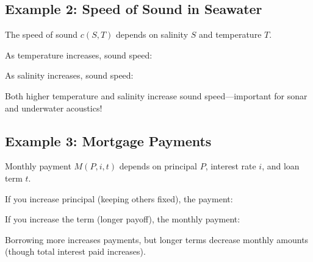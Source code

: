 \documentclass{ximera}
\begin{document}
\subsection*{Example 2: Speed of Sound in Seawater}

\begin{problem}
The speed of sound $c(S, T)$ depends on salinity $S$ and temperature $T$.

As temperature increases, sound speed:
\begin{multipleChoice}
\end{multipleChoice}

As salinity increases, sound speed:
\begin{multipleChoice}
\end{multipleChoice}

\begin{feedback}
Both higher temperature and salinity increase sound speed—important for sonar and underwater acoustics!
\end{feedback}
\end{problem}

\subsection*{Example 3: Mortgage Payments}

\begin{problem}
Monthly payment $M(P, i, t)$ depends on principal $P$, interest rate $i$, and loan term $t$.

If you increase principal (keeping others fixed), the payment:
\begin{multipleChoice}
\end{multipleChoice}

If you increase the term (longer payoff), the monthly payment:
\begin{multipleChoice}
\end{multipleChoice}

\begin{feedback}
Borrowing more increases payments, but longer terms decrease monthly amounts (though total interest paid increases).
\end{feedback}
\end{problem}
\end{document}
